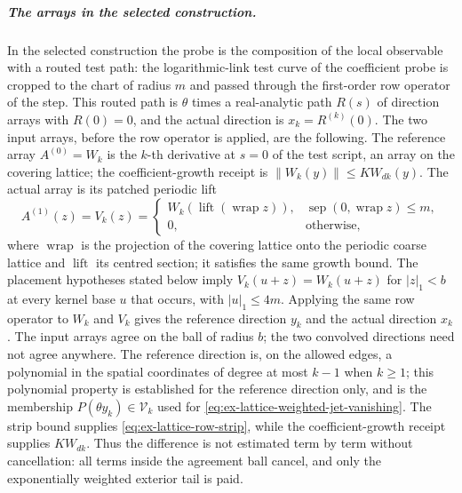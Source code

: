 \subparagraph{The arrays in the selected construction.}
In the selected construction the probe is the composition of the local
observable with a routed test path: the logarithmic-link test curve of the
coefficient probe is cropped to the chart of radius \(m\) and passed
through the first-order row operator of the step. This routed path is
\(\theta\) times a real-analytic path \(R(s)\) of direction arrays with
\(R(0)=0\), and the actual direction is \(x_k=R^{(k)}(0)\). The two input
arrays, before the row operator is applied, are the following. The
reference array \(A^{(0)}=W_k\) is the \(k\)-th derivative at \(s=0\)
of the test script, an array on the covering lattice; the coefficient-growth
receipt is \(\|W_k(y)\|\le KW_{dk}(y)\). The actual array is its patched
periodic lift
\[
 A^{(1)}(z)=V_k(z)=
 \begin{cases}
  W_k(\operatorname{lift}(\operatorname{wrap}z)),
     &\operatorname{sep}(0,\operatorname{wrap}z)\le m,\\
  0,&\text{otherwise},
 \end{cases}
\]
where \(\operatorname{wrap}\) is the projection of the covering lattice
onto the periodic coarse lattice and \(\operatorname{lift}\) its centred
section; it satisfies the same growth bound. The placement hypotheses
stated below imply \(V_k(u+z)=W_k(u+z)\) for \(|z|_1<b\) at every kernel
base \(u\) that occurs, with \(|u|_1\le4m\). Applying the same row operator
to \(W_k\) and \(V_k\) gives the reference direction \(y_k\) and the actual
direction \(x_k\). The input arrays agree on the ball of radius \(b\);
the two convolved
directions need not agree anywhere. The reference direction is, on the
allowed edges, a polynomial in the spatial coordinates of degree at most
\(k-1\) when \(k\ge1\); this polynomial property is established for the
reference direction only, and is the membership
\(P(\theta y_k)\in\mathcal V_k\) used for \eqref{eq:ex-lattice-weighted-jet-vanishing}. The strip bound supplies
\eqref{eq:ex-lattice-row-strip}, while the
coefficient-growth receipt supplies \(K W_{dk}\). Thus the difference is
not estimated term by term without cancellation: all terms inside the
agreement ball cancel, and only the exponentially weighted exterior tail
is paid.

